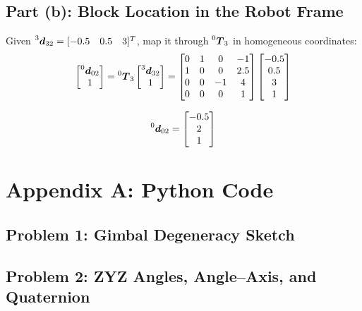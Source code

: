 \documentclass[11pt]{article}
\newcommand{\T}{\bm{T}}
\newcommand{\dvec}{\bm{d}}
\begin{document}
\subsection*{Part (b): Block Location in the Robot Frame}
Given $\prescript{3}{}{\dvec}_{32} = [-0.5\quad 0.5\quad 3]^{T}$, map it through $\prescript{0}{}{\T}_{3}$ in homogeneous coordinates:
\[
    \begin{bmatrix}\prescript{0}{}{\dvec}_{02}\\ 1\end{bmatrix}
    = \prescript{0}{}{\T}_{3}\begin{bmatrix}\prescript{3}{}{\dvec}_{32}\\ 1\end{bmatrix}
    = \begin{bmatrix}
        0 & 1 & 0 & -1\\
        1 & 0 & 0 & 2.5\\
        0 & 0 & -1 & 4\\
        0 & 0 & 0 & 1
    \end{bmatrix}
    \begin{bmatrix}-0.5\\ 0.5\\ 3\\ 1\end{bmatrix}
\]
\begin{result}
\[
    \prescript{0}{}{\dvec}_{02} = \begin{bmatrix}-0.5\\ 2\\ 1\end{bmatrix}
\]
\end{result}

\newpage
\section*{Appendix A: Python Code}

\subsection*{Problem 1: Gimbal Degeneracy Sketch}


\newpage
\subsection*{Problem 2: ZYZ Angles, Angle--Axis, and Quaternion}

\end{document}

